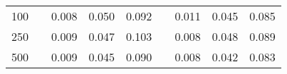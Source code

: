 % 
\begin{tabular}{ccccccccc}
  \hline
  \hline
100 &  & 0.008 & 0.050 & 0.092 &  & 0.011 & 0.045 & 0.085 \\ 
  250 &  & 0.009 & 0.047 & 0.103 &  & 0.008 & 0.048 & 0.089 \\ 
  500 &  & 0.009 & 0.045 & 0.090 &  & 0.008 & 0.042 & 0.083 \\ 
   \hline
\end{tabular}
